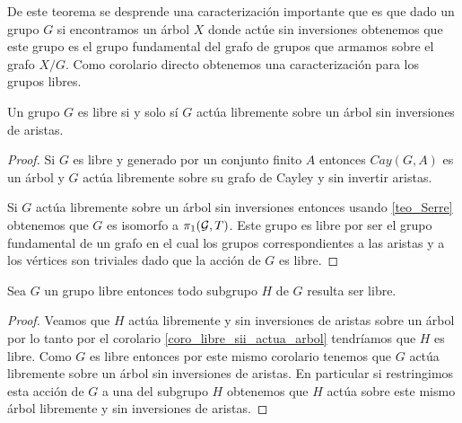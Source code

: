 \documentclass[tesis.tex]{subfiles}
\begin{document}
De este teorema se desprende una caracterización importante que es que dado un grupo $G$ si encontramos un árbol $X$ donde actúe sin inversiones obtenemos que este grupo es el grupo fundamental del grafo de grupos que armamos sobre el grafo $X/G$.
Como corolario directo obtenemos una caracterización para los grupos libres.




\begin{coro}\label{coro_libre_sii_actua_arbol}
	Un grupo $G$ es libre si y solo sí $G$ actúa libremente sobre un árbol sin inversiones de aristas. 
\end{coro}

\begin{proof}
	Si $G$ es libre  y generado por un conjunto finito $A$ entonces $Cay(G,A)$ es un árbol y $G$ actúa libremente sobre su grafo de Cayley y sin invertir aristas.
	
	Si $G$ actúa libremente sobre un árbol sin inversiones entonces usando \ref{teo_Serre} obtenemos que $G$ es isomorfo a $\pi_1({\cal G}, T)$.
	Este grupo es libre por ser el grupo fundamental de un grafo en el cual los grupos correspondientes a las aristas y a los vértices son triviales dado que la acción de $G$ es libre.
	
\end{proof}

\begin{coro}\label{coro_niels_sch}
	Sea $G$ un grupo libre entonces todo subgrupo $H$ de $G$ resulta ser libre.
\end{coro}
\begin{proof} 
	Veamos que $H$ actúa libremente y sin inversiones de aristas sobre un árbol por lo tanto por el corolario \ref{coro_libre_sii_actua_arbol} tendríamos que $H$ es libre.
	Como $G$ es libre entonces por este mismo corolario tenemos que $G$ actúa libremente sobre un árbol sin inversiones de aristas.
	En particular si restringimos esta acción de $G$ a una del subgrupo $H$ obtenemos que $H$ actúa sobre este mismo árbol libremente y sin inversiones de aristas. 
	
\end{proof}

%
%
%
\end{document}
